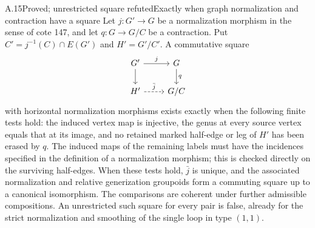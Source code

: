 \begin{result}{A.15}{Proved; unrestricted square refuted}{Exactly when graph normalization and contraction have a square}
Let $j:G'\to G$ be a normalization morphism in the sense of cote 147,
and let $q:G\to G/C$ be a contraction. Put
$C'=j^{-1}(C)\cap E(G')$ and $H'=G'/C'$. A commutative square
\[
\begin{tikzcd}
G'\arrow[r,"j"]\arrow[d]&G\arrow[d,"q"]\\
H'\arrow[r,dashed,"\bar j"]&G/C
\end{tikzcd}
\]
with horizontal normalization morphisms exists exactly when the
following finite tests hold: the induced vertex map is injective,
the genus at every source vertex equals that at its image, and no
retained marked half-edge or leg of $H'$ has been erased by $q$.
The induced maps of the remaining labels must have the incidences
specified in the definition of a normalization morphism; this is
checked directly on the surviving half-edges. When these tests hold,
$\bar j$ is unique, and the associated normalization and relative
generization groupoids form a commuting square up to a canonical
isomorphism. The comparisons are coherent under further admissible
compositions. An unrestricted such square for every pair is false,
already for the strict normalization and smoothing of the single
loop in type $(1,1)$.
\end{result}
